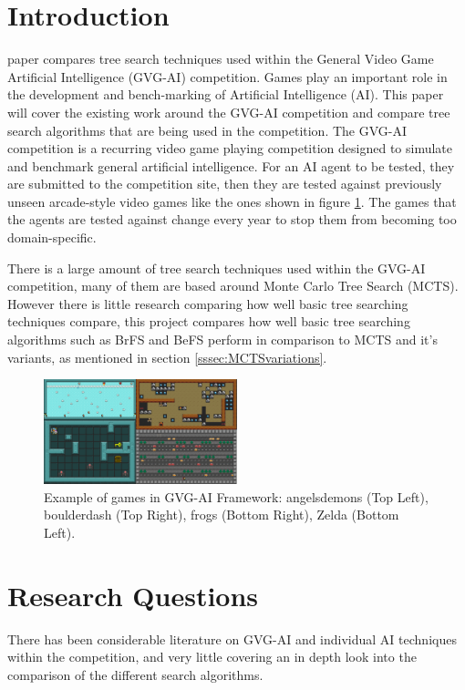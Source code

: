 \documentclass[journal]{IEEEtran}
\begin{document}
\section{Introduction}
	 paper compares tree search techniques used within the General Video Game Artificial Intelligence (GVG-AI) competition.  
	Games play an important role in the development and bench-marking of Artificial Intelligence (AI). This paper will cover the existing work around the GVG-AI competition and compare tree search algorithms that are being used in the competition.
	The GVG-AI competition is a recurring video game playing competition designed to simulate and benchmark general artificial intelligence. For an AI agent to be tested, they are submitted to the competition site, then they are tested against previously unseen arcade-style video games like the ones shown in figure \ref{fig:VGDL}. The games that the agents are tested against change every year to stop them from becoming too domain-specific.

	There is a large amount of tree search techniques used within the GVG-AI competition, many of them are based around Monte Carlo Tree Search (MCTS). However there is little research comparing how well basic tree searching techniques compare, this project compares how well basic tree searching algorithms such as BrFS and BeFS perform in comparison to MCTS and it's variants, as mentioned in section \ref{sssec:MCTSvariations}.

\begin{figure}[h]
		    \centering
		    \includegraphics[width=0.5\textwidth]{VGDL2}
		    \caption{Example of games in GVG-AI Framework: angelsdemons (Top Left), boulderdash (Top Right), frogs (Bottom Right), Zelda (Bottom Left). }
		    \label{fig:VGDL}
		\end{figure}
		
\section{Research Questions}

	There has been considerable literature on GVG-AI and individual AI techniques within the competition, and very little covering an in depth look into the comparison of the different search algorithms.
\end{document}
